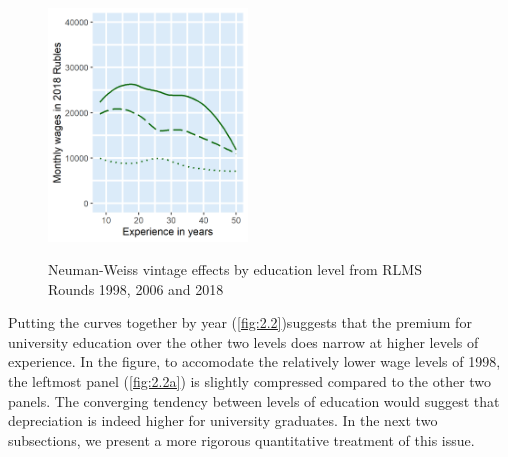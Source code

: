 \documentclass[12pt,a4paper]{article}
\numberwithin{equation}{section}
\begin{document}
\begin{figure}[H]
\begin{minipage}[b]{.3\linewidth}
			\label{fig:2.1b}
		\end{minipage}
		\hfill
		\begin{minipage}[b]{.3\linewidth}
			\centering
			\hspace*{-0.7in}
			\includegraphics[width=150pt]{dp01_se.png}
			\label{fig:2.1c}
		\end{minipage}
		\caption{Neuman-Weiss vintage effects by education level from RLMS Rounds 1998, 2006 and 2018}\label{fig:2.1}
	\end{figure}
	
Putting the curves together by year (\ref{fig:2.2})suggests that the premium for university education over the other two levels does narrow at higher levels of experience. In the figure, to accomodate the relatively lower wage levels of 1998, the leftmost panel (\ref{fig:2.2a}) is slightly compressed compared to the other two panels. The  converging tendency between levels of education would suggest that depreciation is indeed higher for university graduates. In the next two subsections, we present a more rigorous quantitative treatment of this issue.
\end{document}
